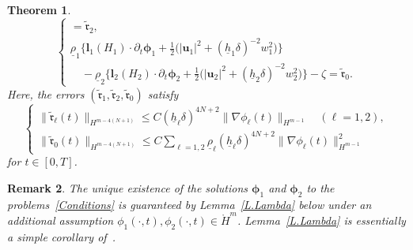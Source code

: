 \documentclass[11pt,leqno]{article}
\newtheorem{theorem}{\bf Theorem}[section]
\newtheorem{remark}[theorem]{\bf Remark}
\numberwithin{equation}{section}
\numberwithin{figure}{section}
\begin{document}
\begin{theorem}
\[\begin{cases}
  = \tilde{\bm{\mathfrak{r}}}_2, \\
 \underline{\rho}_1\bigl\{ {\bm l}_1(H_1) \cdot \partial_t{\bm \phi}_1 
   + \frac12\bigl( |{\bm u}_1|^2 + (\underline{h}_1\delta)^{-2} w_1^2 \bigr) \bigr\} \\
 \quad
 - \underline{\rho}_2\bigl\{ {\bm l}_2(H_2) \cdot \partial_t{\bm \phi}_2 
  + \frac12\bigl( |{\bm u}_2|^2 +  (\underline{h}_2\delta)^{-2} w_2^2 \bigr) \bigr\} 
 - \zeta = \tilde{\mathfrak{r}}_0. 
\end{cases}
\]
%
Here, the errors $(\tilde{\bm{\mathfrak{r}}}_1,\tilde{\bm{\mathfrak{r}}}_2,\tilde{\mathfrak{r}}_0)$ satisfy 
%
\begin{equation}\label{error-estimate}
\begin{cases}
 \|\tilde{\bm{\mathfrak{r}}}_\ell(t)\|_{H^{m-4(N+1)}}
  \leq C (\underline{h}_\ell\delta)^{4N+2}\|\nabla\phi_\ell(t)\|_{H^{m-1}}
  \quad (\ell=1,2), \\
 \displaystyle
 \|\tilde{\mathfrak{r}}_0(t)\|_{H^{m-4(N+1)}} \leq 
  C\sum_{\ell=1,2}\underline{\rho}_\ell(\underline{h}_\ell\delta)^{4N+2}\|\nabla\phi_\ell(t)\|_{H^{m-1}}^2
\end{cases}
\end{equation}
%
for $t\in[0,T]$. 
\end{theorem}


\begin{remark}
{\rm
The unique existence of the solutions $\bm{\phi}_1$ and $\bm{\phi}_2$ to the problems~\eqref{Conditions} 
is guaranteed by Lemma~\ref{L.Lambda} below under an additional assumption $\phi_1(\cdot,t),\phi_2(\cdot,t) 
\in \mathring{H}^m$. 
Lemma~\ref{L.Lambda} is essentially a simple corollary of~\cite[Lemma 3.4]{Iguchi2018-2}. 
}
\end{remark}
\end{document}
